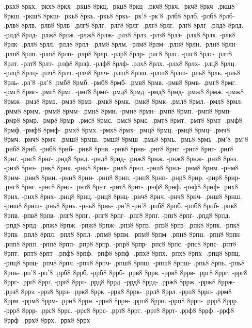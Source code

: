 {.ркх8 8ркх. -ркх8 8ркх-
.ркц8 8ркц. -ркц8 8ркц-
.ркч8 8ркч. -ркч8 8ркч-
.ркш8 8ркш. -ркш8 8ркш-
.ркь8 8ркь. -ркь8 8ркь-
.рк'8 -рк'8
.рлб8 8рлб. -рлб8 8рлб-
.рлв8 8рлв. -рлв8 8рлв-
.рлг8 8рлг. -рлг8 8рлг-
.рлґ8 8рлґ. -рлґ8 8рлґ-
.рлд8 8рлд. -рлд8 8рлд-
.рлж8 8рлж. -рлж8 8рлж-
.рлз8 8рлз. -рлз8 8рлз-
.рлк8 8рлк. -рлк8 8рлк-
.рлл8 8рлл. -рлл8 8рлл-
.рлм8 8рлм. -рлм8 8рлм-
.рлн8 8рлн. -рлн8 8рлн-
.рлп8 8рлп. -рлп8 8рлп-
.рлр8 8рлр. -рлр8 8рлр-
.рлс8 8рлс. -рлс8 8рлс-
.рлт8 8рлт. -рлт8 8рлт-
.рлф8 8рлф. -рлф8 8рлф-
.рлх8 8рлх. -рлх8 8рлх-
.рлц8 8рлц. -рлц8 8рлц-
.рлч8 8рлч. -рлч8 8рлч-
.рлш8 8рлш. -рлш8 8рлш-
.рль8 8рль. -рль8 8рль-
.рл'8 -рл'8
.рмб8 8рмб. -рмб8 8рмб-
.рмв8 8рмв. -рмв8 8рмв-
.рмг8 8рмг. -рмг8 8рмг-
.рмґ8 8рмґ. -рмґ8 8рмґ-
.рмд8 8рмд. -рмд8 8рмд-
.рмж8 8рмж. -рмж8 8рмж-
.рмз8 8рмз. -рмз8 8рмз-
.рмк8 8рмк. -рмк8 8рмк-
.рмл8 8рмл. -рмл8 8рмл-
.рмм8 8рмм. -рмм8 8рмм-
.рмн8 8рмн. -рмн8 8рмн-
.рмп8 8рмп. -рмп8 8рмп-
.рмр8 8рмр. -рмр8 8рмр-
.рмс8 8рмс. -рмс8 8рмс-
.рмт8 8рмт. -рмт8 8рмт-
.рмф8 8рмф. -рмф8 8рмф-
.рмх8 8рмх. -рмх8 8рмх-
.рмц8 8рмц. -рмц8 8рмц-
.рмч8 8рмч. -рмч8 8рмч-
.рмш8 8рмш. -рмш8 8рмш-
.рмь8 8рмь. -рмь8 8рмь-
.рм'8 -рм'8
.рнб8 8рнб. -рнб8 8рнб-
.рнв8 8рнв. -рнв8 8рнв-
.рнг8 8рнг. -рнг8 8рнг-
.рнґ8 8рнґ. -рнґ8 8рнґ-
.рнд8 8рнд. -рнд8 8рнд-
.рнж8 8рнж. -рнж8 8рнж-
.рнз8 8рнз. -рнз8 8рнз-
.рнк8 8рнк. -рнк8 8рнк-
.рнл8 8рнл. -рнл8 8рнл-
.рнм8 8рнм. -рнм8 8рнм-
.рнн8 8рнн. -рнн8 8рнн-
.рнп8 8рнп. -рнп8 8рнп-
.рнр8 8рнр. -рнр8 8рнр-
.рнс8 8рнс. -рнс8 8рнс-
.рнт8 8рнт. -рнт8 8рнт-
.рнф8 8рнф. -рнф8 8рнф-
.рнх8 8рнх. -рнх8 8рнх-
.рнц8 8рнц. -рнц8 8рнц-
.рнч8 8рнч. -рнч8 8рнч-
.рнш8 8рнш. -рнш8 8рнш-
.рнь8 8рнь. -рнь8 8рнь-
.рн'8 -рн'8
.рпб8 8рпб. -рпб8 8рпб-
.рпв8 8рпв. -рпв8 8рпв-
.рпг8 8рпг. -рпг8 8рпг-
.рпґ8 8рпґ. -рпґ8 8рпґ-
.рпд8 8рпд. -рпд8 8рпд-
.рпж8 8рпж. -рпж8 8рпж-
.рпз8 8рпз. -рпз8 8рпз-
.рпк8 8рпк. -рпк8 8рпк-
.рпл8 8рпл. -рпл8 8рпл-
.рпм8 8рпм. -рпм8 8рпм-
.рпн8 8рпн. -рпн8 8рпн-
.рпп8 8рпп. -рпп8 8рпп-
.рпр8 8рпр. -рпр8 8рпр-
.рпс8 8рпс. -рпс8 8рпс-
.рпт8 8рпт. -рпт8 8рпт-
.рпф8 8рпф. -рпф8 8рпф-
.рпх8 8рпх. -рпх8 8рпх-
.рпц8 8рпц. -рпц8 8рпц-
.рпч8 8рпч. -рпч8 8рпч-
.рпш8 8рпш. -рпш8 8рпш-
.рпь8 8рпь. -рпь8 8рпь-
.рп'8 -рп'8
.ррб8 8ррб. -ррб8 8ррб-
.ррв8 8ррв. -ррв8 8ррв-
.ррг8 8ррг. -ррг8 8ррг-
.ррґ8 8ррґ. -ррґ8 8ррґ-
.ррд8 8ррд. -ррд8 8ррд-
.ррж8 8ррж. -ррж8 8ррж-
.ррз8 8ррз. -ррз8 8ррз-
.ррк8 8ррк. -ррк8 8ррк-
.ррл8 8ррл. -ррл8 8ррл-
.ррм8 8ррм. -ррм8 8ррм-
.ррн8 8ррн. -ррн8 8ррн-
.ррп8 8ррп. -ррп8 8ррп-
.ррр8 8ррр. -ррр8 8ррр-
.ррс8 8ррс. -ррс8 8ррс-
.ррт8 8ррт. -ррт8 8ррт-
.ррф8 8ррф. -ррф8 8ррф-
.ррх8 8ррх. -ррх8 8ррх-
}
